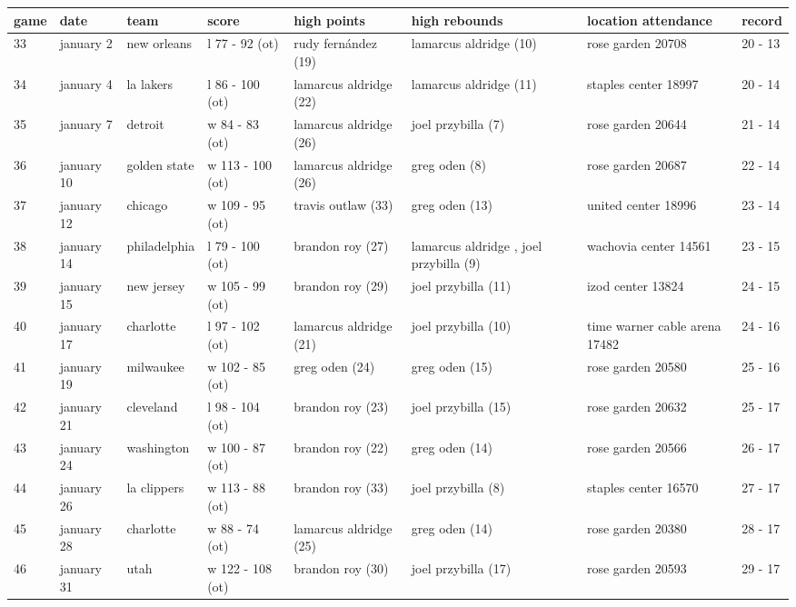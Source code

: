 \documentclass{article}
\begin{document}
\begin{tabular}{llllllll}
\toprule
game & date & team & score & high points & high rebounds & location attendance & record \\
\midrule
33 & january 2 & new orleans & l 77 - 92 (ot) & rudy fernández (19) & lamarcus aldridge (10) & rose garden 20708 & 20 - 13 \\
34 & january 4 & la lakers & l 86 - 100 (ot) & lamarcus aldridge (22) & lamarcus aldridge (11) & staples center 18997 & 20 - 14 \\
35 & january 7 & detroit & w 84 - 83 (ot) & lamarcus aldridge (26) & joel przybilla (7) & rose garden 20644 & 21 - 14 \\
36 & january 10 & golden state & w 113 - 100 (ot) & lamarcus aldridge (26) & greg oden (8) & rose garden 20687 & 22 - 14 \\
37 & january 12 & chicago & w 109 - 95 (ot) & travis outlaw (33) & greg oden (13) & united center 18996 & 23 - 14 \\
38 & january 14 & philadelphia & l 79 - 100 (ot) & brandon roy (27) & lamarcus aldridge , joel przybilla (9) & wachovia center 14561 & 23 - 15 \\
39 & january 15 & new jersey & w 105 - 99 (ot) & brandon roy (29) & joel przybilla (11) & izod center 13824 & 24 - 15 \\
40 & january 17 & charlotte & l 97 - 102 (ot) & lamarcus aldridge (21) & joel przybilla (10) & time warner cable arena 17482 & 24 - 16 \\
41 & january 19 & milwaukee & w 102 - 85 (ot) & greg oden (24) & greg oden (15) & rose garden 20580 & 25 - 16 \\
42 & january 21 & cleveland & l 98 - 104 (ot) & brandon roy (23) & joel przybilla (15) & rose garden 20632 & 25 - 17 \\
43 & january 24 & washington & w 100 - 87 (ot) & brandon roy (22) & greg oden (14) & rose garden 20566 & 26 - 17 \\
44 & january 26 & la clippers & w 113 - 88 (ot) & brandon roy (33) & joel przybilla (8) & staples center 16570 & 27 - 17 \\
45 & january 28 & charlotte & w 88 - 74 (ot) & lamarcus aldridge (25) & greg oden (14) & rose garden 20380 & 28 - 17 \\
46 & january 31 & utah & w 122 - 108 (ot) & brandon roy (30) & joel przybilla (17) & rose garden 20593 & 29 - 17 \\
\bottomrule
\end{tabular}
\end{document}
